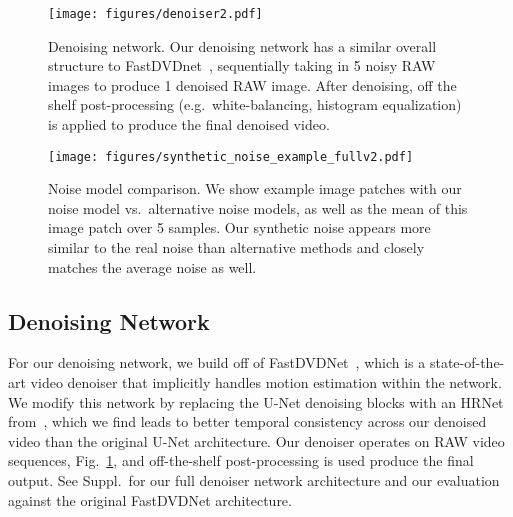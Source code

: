 \documentclass[final]{cvpr}
\begin{document}
\begin{figure}[thb]
\centering
\texttt{[image: figures/denoiser2.pdf]}
   \caption{Denoising network. Our denoising network has a similar overall structure to FastDVDnet~\cite{tassano2020fastdvdnet}, sequentially taking in 5 noisy RAW images to produce 1 denoised RAW image. After denoising, off the shelf post-processing (e.g.\ white-balancing, histogram equalization) is applied to produce the final denoised video. }
\label{fig:denoiser}
\vspace{-4mm}
\end{figure}

\begin{figure*}[!thb]
\centering
\texttt{[image: figures/synthetic\_noise\_example\_fullv2.pdf]}
   \caption{Noise model comparison. We show example image patches with our noise model vs.\ alternative noise models, as well as the mean of this image patch over 5 samples. Our synthetic noise appears more similar to the real noise than alternative methods and closely matches the average noise as well.}
\label{fig:noise_comparison}
\vspace{-4mm}
\end{figure*}

\subsection{Denoising Network}
For our denoising network, we build off of FastDVDNet~\cite{tassano2020fastdvdnet}, which is a state-of-the-art video denoiser that implicitly handles motion estimation within the network. We modify this network by replacing the U-Net denoising blocks with an HRNet from~\cite{sun2019deep}, which we find leads to better temporal consistency across our denoised video than the original U-Net architecture. Our denoiser operates on RAW video sequences, Fig.~\ref{fig:denoiser}, and off-the-shelf post-processing is used produce the final output. See Suppl.\ for our full denoiser network architecture and our evaluation against the original FastDVDNet architecture.
\end{document}
